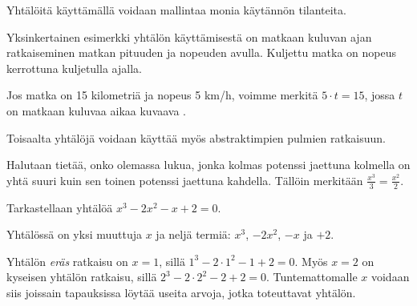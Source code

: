 



Yhtälöitä käyttämällä voidaan mallintaa monia käytännön tilanteita.

\begin{esimerkki}
	Yksinkertainen esimerkki yhtälön käyttämisestä on matkaan kuluvan ajan ratkaiseminen matkan pituuden ja nopeuden avulla. Kuljettu matka on nopeus kerrottuna kuljetulla ajalla. 
	
	Jos matka on 15 kilometriä ja nopeus 5 km/h, voimme merkitä $5\cdot t=15$, jossa $t$ on matkaan kuluvaa aikaa kuvaava .
\end{esimerkki}

Toisaalta yhtälöjä voidaan käyttää myös abstraktimpien pulmien ratkaisuun.

\begin{esimerkki}
	Halutaan tietää, onko olemassa lukua, jonka kolmas potenssi jaettuna kolmella on yhtä suuri kuin sen toinen potenssi jaettuna kahdella. Tällöin merkitään $\frac{x^3}{3}=\frac{x^2}{2}$. 
\end{esimerkki}


\begin{esimerkki}
 Tarkastellaan yhtälöä $x^3-2x^2-x+2=0$. 
 
 Yhtälössä on yksi muuttuja $x$ ja neljä termiä: $x^3$, $-2x^2$, $-x$ ja $+2$.  
 
 Yhtälön \textit{eräs} ratkaisu on $x=1$, sillä $1^3-2\cdot{1^2}-1+2=0$. 
 Myös $x=2$ on kyseisen yhtälön ratkaisu, sillä $2^3-2\cdot{2^2}-2+2=0$. 
 Tuntemattomalle $x$ voidaan siis joissain tapauksissa löytää useita arvoja, jotka toteuttavat yhtälön. 
\end{esimerkki}


